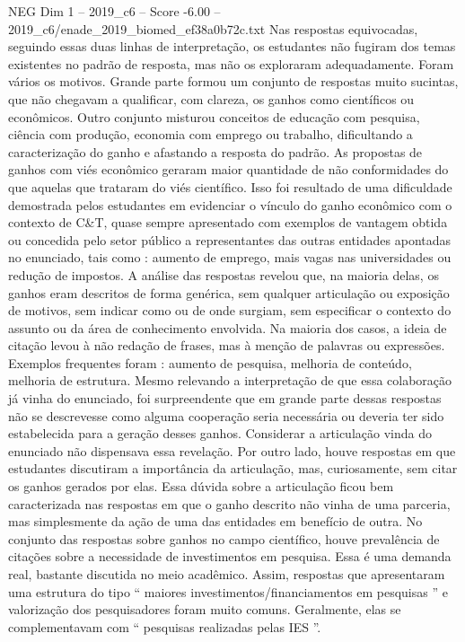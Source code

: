 \begin{textsample}{NEG Dim 1 – 2019\_c6 – Score -6.00 – 2019\_c6/enade\_2019\_biomed\_ef38a0b72c.txt}
Nas respostas equivocadas, seguindo essas duas linhas de interpretação, os estudantes não fugiram dos temas existentes no padrão de resposta, mas não os exploraram adequadamente.
Foram vários os motivos.
Grande parte formou um conjunto de respostas muito sucintas, que não chegavam a qualificar, com clareza, os ganhos como científicos ou econômicos.
Outro conjunto misturou conceitos de educação com pesquisa, ciência com produção, economia com emprego ou trabalho, dificultando a caracterização do ganho e afastando a resposta do padrão.
As propostas de ganhos com viés econômico geraram maior quantidade de não conformidades do que aquelas que trataram do viés científico.
Isso foi resultado de uma dificuldade demostrada pelos estudantes em evidenciar o vínculo do ganho econômico com o contexto de C\&T, quase sempre apresentado com exemplos de vantagem obtida ou concedida pelo setor público a representantes das outras entidades apontadas no enunciado, tais como : aumento de emprego, mais vagas nas universidades ou redução de impostos.
A análise das respostas revelou que, na maioria delas, os ganhos eram descritos de forma genérica, sem qualquer articulação ou exposição de motivos, sem indicar como ou de onde surgiam, sem especificar o contexto do assunto ou da área de conhecimento envolvida.
Na maioria dos casos, a ideia de citação levou à não redação de frases, mas à menção de palavras ou expressões.
Exemplos frequentes foram : aumento de pesquisa, melhoria de conteúdo, melhoria de estrutura.
Mesmo relevando a interpretação de que essa colaboração já vinha do enunciado, foi surpreendente que em grande parte dessas respostas não se descrevesse como alguma cooperação seria necessária ou deveria ter sido estabelecida para a geração desses ganhos.
Considerar a articulação vinda do enunciado não dispensava essa revelação.
Por outro lado, houve respostas em que estudantes discutiram a importância da articulação, mas, curiosamente, sem citar os ganhos gerados por elas.
Essa dúvida sobre a articulação ficou bem caracterizada nas respostas em que o ganho descrito não vinha de uma parceria, mas simplesmente da ação de uma das entidades em benefício de outra.
No conjunto das respostas sobre ganhos no campo científico, houve prevalência de citações sobre a necessidade de investimentos em pesquisa.
Essa é uma demanda real, bastante discutida no meio acadêmico.
Assim, respostas que apresentaram uma estrutura do tipo “ maiores investimentos/financiamentos em pesquisas ” e valorização dos pesquisadores foram muito comuns.
Geralmente, elas se complementavam com “ pesquisas realizadas pelas IES ”.

\end{textsample}
